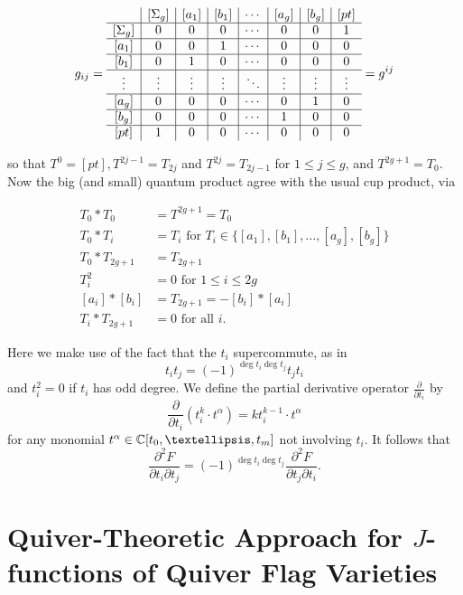 \documentclass{amsart}
\begin{document}
\[ g_{ij} = \begin{array}{c|c|c|c|c|c|c| c}
& \left[\Sigma_g\right]& \left[a_1\right] & \left[b_1\right] & \cdots & \left[a_g\right] & \left[b_g\right] & \left[pt\right] \\
\hline
\left[\Sigma_g\right] & 0 & 0 & 0 & \cdots & 0 & 0 & 1 \\
\hline 
\left[a_1\right] & 0 & 0 & 1 & \cdots & 0 & 0 & 0 \\
\hline 
\left[b_1\right] & 0 & 1 & 0 & \cdots & 0 & 0 & 0 \\
\hline 
\vdots & \vdots & \vdots & \vdots & \ddots & \vdots & \vdots & \vdots \\
\hline 
\left[a_g\right] & 0 & 0 & 0 & \cdots & 0 & 1 & 0 \\
\hline 
\left[b_g\right] & 0 & 0 & 0 & \cdots & 1 & 0 & 0  \\
\hline 
\left[pt\right] & 1 & 0 & 0 & \cdots & 0 & 0 & 0 \\
 \end{array} = g^{ij} \]

 so that $T^0 = [pt], T^{2j-1}=T_{2j}$ and $T^{2j}=T_{2j-1}$ for $1\leq j \leq g$, and $T^{2g+1}=T_0$. Now the big (and small) quantum product agree with the usual cup product, via

 \begin{align*}
     T_0 * T_0 &= T^{2g+1}=T_0\\
     T_0*T_i &= T_i \text{ for } T_i \in \{[a_1],[b_1], \dots, [a_g],[b_g] \}\\
     T_0 * T_{2g+1} &= T_{2g+1}\\
     T_i^2 &= 0 \text{ for } 1\leq i \leq 2g\\
     [a_i]*[b_i] &= T_{2g+1} = -[b_i]*[a_i]\\
     T_i*T_{2g+1}&= 0 \text{ for all }i.      
 \end{align*}

Here we make use of the fact that the $t_i$ supercommute, as in \[ t_i t_j = (-1)^{\deg t_i \deg t_j} t_j t_i \] and $t_i^2=0$ if $t_i$ has odd degree. We define the partial derivative operator $\frac{\partial}{\partial t_i}$ by \[ \frac{\partial }{\partial t_i} (t_i^k \cdot t^\alpha) = kt_i^{k-1} \cdot t^\alpha \] for any monomial $t^\alpha \in \C[t_0, \dots, t_m]$ not involving $t_i$. It follows that \[ \frac{ \partial^2 F}{\partial t_i \partial t_j} = (-1)^{\deg t_i \deg t_j } \frac{ \partial^2 F}{\partial t_j \partial t_i}. \] 

\section{Quiver-Theoretic Approach for $J$-functions of Quiver Flag Varieties}
\end{document}
